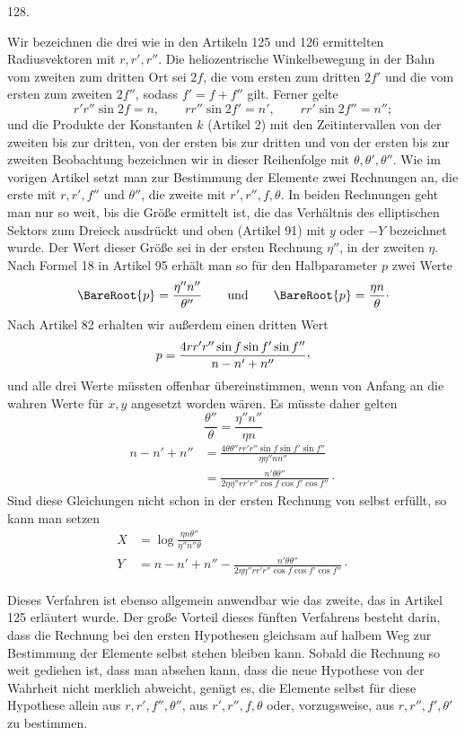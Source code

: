 \par{}\medskip
\begin{center}\hypertarget{native-174-article128}{}128.\end{center}
Wir bezeichnen die drei wie in den Artikeln 125 und 126 ermittelten Radiusvektoren mit $r,r',r''$.
Die heliozentrische Winkelbewegung in der Bahn vom zweiten zum dritten Ort sei $2f$, die vom
ersten zum dritten $2f'$ und die vom ersten zum zweiten $2f''$, sodass $f'=f+f''$ gilt. Ferner gelte
\[
r'r''\sin2f=n,\qquad rr''\sin2f'=n',\qquad rr'\sin2f''=n'';
\]
und die Produkte der Konstanten $k$ (Artikel 2) mit den Zeitintervallen von der zweiten bis zur
dritten, von der ersten bis zur dritten und von der ersten bis zur zweiten Beobachtung bezeichnen
wir in dieser Reihenfolge mit $\theta,\theta',\theta''$. Wie im vorigen Artikel setzt man zur Bestimmung der Elemente
zwei Rechnungen an, die erste mit $r,r',f''$ und $\theta''$, die zweite mit $r',r'',f,\theta$. In beiden Rechnungen geht man
nur so weit, bis die Größe ermittelt ist, die das Verhältnis des elliptischen Sektors zum Dreieck
ausdrückt und oben (Artikel 91) mit $y$ oder $-Y$ bezeichnet wurde. Der Wert dieser Größe sei in
der ersten Rechnung $\eta''$, in der zweiten $\eta$. Nach Formel 18 in Artikel 95 erhält man so für den
Halbparameter $p$ zwei Werte
\[
\BareRoot{p}=\frac{\eta''n''}{\theta''}\qquad\text{und}\qquad
\BareRoot{p}=\frac{\eta n}{\theta}\mathpunct{\cdot}
\]
Nach Artikel 82 erhalten wir außerdem einen dritten Wert
\[
p=\frac{4rr'r''\sin f\sin f'\sin f''}{n-n'+n''}\mathpunct{\raisebox{.45ex}{,}}
\]
und alle drei Werte müssten offenbar übereinstimmen, wenn von Anfang an die wahren Werte für $x,y$
angesetzt worden wären. Es müsste daher gelten
\[
\frac{\theta''}{\theta}=\frac{\eta''n''}{\eta n}
\]
\[
\begin{aligned}
n-n'+n''&=\frac{4\theta\theta''rr'r''\sin f\sin f'\sin f''}{\eta\eta''nn''}\\[5pt]
&=\frac{n'\theta\theta''}{2\eta\eta''rr'r''\cos f\cos f'\cos f''}\mathpunct{\cdot}
\end{aligned}
\]
Sind diese Gleichungen nicht schon in der ersten Rechnung von selbst erfüllt, so kann man setzen
\[
\begin{aligned}
X&=\log\frac{\eta n\theta''}{\eta''n''\theta}\\[5pt]
Y&=n-n'+n''-\frac{n'\theta\theta''}{2\eta\eta''rr'r''\cos f\cos f'\cos f''}\mathpunct{\cdot}
\end{aligned}
\]

Dieses Verfahren ist ebenso allgemein anwendbar wie das zweite, das in Artikel 125 erläutert wurde.
Der große Vorteil dieses fünften Verfahrens besteht darin, dass die Rechnung bei den ersten
Hypothesen gleichsam auf halbem Weg zur Bestimmung der Elemente selbst stehen bleiben kann. Sobald
die Rechnung so weit gediehen ist, dass man absehen kann, dass die neue Hypothese von der Wahrheit
nicht merklich abweicht, genügt es, die Elemente selbst für diese Hypothese allein aus $r,r',f'',\theta''$, aus
$r',r'',f,\theta$ oder, vorzugsweise, aus $r,r'',f',\theta'$ zu bestimmen.
